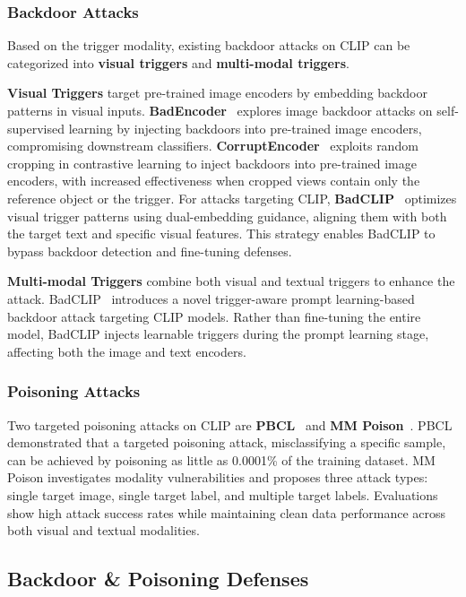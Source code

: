 \subsubsection{Backdoor Attacks}

Based on the trigger modality, existing backdoor attacks on CLIP can be categorized into \textbf{visual triggers} and \textbf{multi-modal triggers}.

\textbf{Visual Triggers} target pre-trained image encoders by embedding backdoor patterns in visual inputs.
\textbf{BadEncoder}~\cite{jia2022badencoder} explores image backdoor attacks on self-supervised learning by injecting backdoors into pre-trained image encoders, compromising downstream classifiers. \textbf{CorruptEncoder}~\cite{zhang2024data} exploits random cropping in contrastive learning to inject backdoors into pre-trained image encoders, with increased effectiveness when cropped views contain only the reference object or the trigger.
For attacks targeting CLIP, \textbf{BadCLIP}~\cite{liang2024badclip} optimizes visual trigger patterns using dual-embedding guidance, aligning them with both the target text and specific visual features. This strategy enables BadCLIP to bypass backdoor detection and fine-tuning defenses.

\textbf{Multi-modal Triggers} combine both visual and textual triggers to enhance the attack. BadCLIP~\cite{bai2024badclip} introduces a novel trigger-aware prompt learning-based backdoor attack targeting CLIP models. Rather than fine-tuning the entire model, BadCLIP injects learnable triggers during the prompt learning stage, affecting both the image and text encoders.

\subsubsection{Poisoning Attacks}
Two targeted poisoning attacks on CLIP are \textbf{PBCL}~\cite{carlini2022poisoning} and \textbf{MM Poison}~\cite{yang2023data}. PBCL demonstrated that a targeted poisoning attack, misclassifying a specific sample, can be achieved by poisoning as little as 0.0001\% of the training dataset. MM Poison investigates modality vulnerabilities and proposes three attack types: single target image, single target label, and multiple target labels. Evaluations show high attack success rates while maintaining clean data performance across both visual and textual modalities.

\subsection{Backdoor \& Poisoning Defenses}
\label{sec:vlp-bp-defenses}

